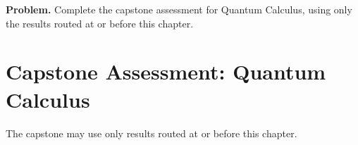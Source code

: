 \newpage
{}
\label{cap:quantum-calculus}

\begin{tcolorbox}[
  colback=gray!6,
  colframe=gray!40,
  arc=2pt,
  left=8pt, right=8pt, top=6pt, bottom=6pt,
  title={\small\textbf{Capstone Problem}},
  fonttitle=\small\bfseries
]
\textbf{Problem.}
Complete the capstone assessment for Quantum Calculus, using only the results routed at or before this chapter.
\end{tcolorbox}

\section{Capstone Assessment: Quantum Calculus}

\begin{remark*}
The capstone may use only results routed at or before this chapter.
\end{remark*}

\clearpage